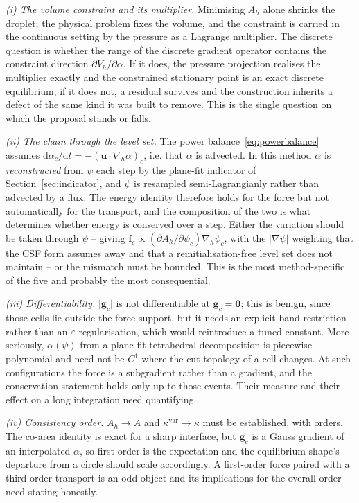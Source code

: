 \documentclass[preprint,3p,11pt]{elsarticle}
\newcommand{\psilev}{\psi}                       %
\newcommand{\uvec}{\mathbf{u}}
\begin{document}
\emph{(i) The volume constraint and its multiplier.} Minimising $A_h$ alone shrinks the
droplet; the physical problem fixes the volume, and the constraint is carried in the
continuous setting by the pressure as a Lagrange multiplier. The discrete question is
whether the range of the discrete gradient operator contains the constraint direction
$\partial V_h/\partial\alpha$. If it does, the pressure projection realises the multiplier
exactly and the constrained stationary point is an exact discrete equilibrium; if it does
not, a residual survives and the construction inherits a defect of the same kind it was
built to remove. This is the single question on which the proposal stands or falls.

\emph{(ii) The chain through the level set.} The power balance~\eqref{eq:powerbalance}
assumes $\mathrm d\alpha_c/\mathrm dt=-(\uvec\cdot\nabla_{\!h}\alpha)_c$, i.e. that
$\alpha$ is advected. In this method $\alpha$ is \emph{reconstructed} from $\psilev$ each
step by the plane-fit indicator of Section~\ref{sec:indicator}, and $\psilev$ is resampled
semi-Lagrangianly rather than advected by a flux. The energy identity therefore holds for
the force but not automatically for the transport, and the composition of the two is what
determines whether energy is conserved over a step. Either the variation should be taken
through $\psilev$ -- giving $\mathbf f_c\propto(\partial A_h/\partial\psilev_c)
\nabla_{\!h}\psilev_c$, with the $\lvert\nabla\psilev\rvert$ weighting that the CSF form
assumes away and that a reinitialisation-free level set does not maintain -- or the
mismatch must be bounded. This is the most method-specific of the five and probably the
most consequential.

\emph{(iii) Differentiability.} $\lvert\mathbf g_c\rvert$ is not differentiable at
$\mathbf g_c=\mathbf 0$; this is benign, since those cells lie outside the force support,
but it needs an explicit band restriction rather than an $\varepsilon$-regularisation, which
would reintroduce a tuned constant. More seriously, $\alpha(\psilev)$ from a plane-fit
tetrahedral decomposition is piecewise polynomial and need not be $C^1$ where the cut
topology of a cell changes. At such configurations the force is a subgradient rather than a
gradient, and the conservation statement holds only up to those events. Their measure and
their effect on a long integration need quantifying.

\emph{(iv) Consistency order.} $A_h\to A$ and $\kappa^{\mathrm{var}}\to\kappa$ must be
established, with orders. The co-area identity is exact for a sharp interface, but
$\mathbf g_c$ is a Gauss gradient of an interpolated $\alpha$, so first order is the
expectation and the equilibrium shape's departure from a circle should scale accordingly.
A first-order force paired with a third-order transport is an odd object and its
implications for the overall order need stating honestly.
\end{document}
